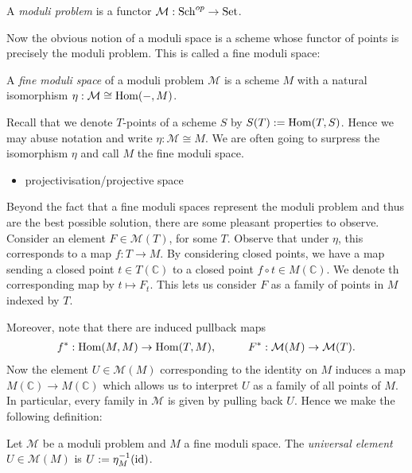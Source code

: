 \documentclass[12pt]{ociamthesis}  %
\begin{document}
\begin{definition}
  A \emph{moduli problem} is a functor $\mathcal M:\operatorname{Sch}^{op}\to\operatorname{Set}$.
\end{definition}

Now the obvious notion of a moduli space is a scheme whose functor
of points is precisely the moduli problem. This is called a fine
moduli space:

\begin{definition}
  A \emph{fine moduli space} of a moduli problem $\mathcal M$
  is a scheme $M$ with a natural isomorphism
  $\eta : \mathcal M \cong \operatorname{Hom}(-,M)$.
\end{definition}

Recall that we denote $T$-points of a scheme $S$ by
$S(T) := \operatorname{Hom}(T,S)$. Hence we may abuse notation and write
$\eta : \mathcal M \cong M$. We are often going to surpress the
isomorphism $\eta$ and call $M$ the fine moduli space.

\begin{example}
  \begin{itemize}
    \item projectivisation/projective space
  \end{itemize}
\end{example}

Beyond the fact that a fine moduli spaces represent the moduli
problem and thus are the best possible solution, there are some
pleasant properties to observe.
Consider an element $F\in\mathcal M(T)$, for some $T$. Observe that
under $\eta$, this corresponds to a map $f:T\to M$. By considering
closed points, we have a map sending a closed point $t\in T(\mathbb C)$
to a closed point $f\circ t\in M(\mathbb C)$. We denote th corresponding
map by $t \mapsto F_t$. This lets us consider $F$ as a family of
points in $M$ indexed by $T$.

Moreover, note that there are induced
pullback maps
\begin{align*}
  f^* : \operatorname{Hom}(M,M)\to\operatorname{Hom}(T,M), \hspace{1cm}
  F^* : \mathcal M(M)\to \mathcal M(T).
\end{align*}
Now the element $U\in\mathcal M(M)$ corresponding to the identity on $M$
induces a map $M(\mathbb C)\to M(\mathbb C)$ which allows us to
interpret $U$ as a family of all points of $M$. In particular,
every family in $\mathcal M$ is given by pulling back $U$.
Hence we make the following definition:

\begin{definition}
  Let $\mathcal M$ be a moduli problem and $M$ a fine moduli space.
  The \emph{universal element} $U\in\mathcal M(M)$ is
  $U:=\eta^{-1}_M (\operatorname{id})$.
\end{definition}
\end{document}
